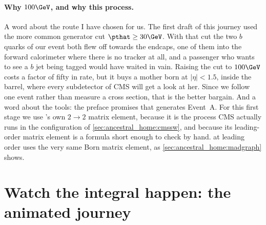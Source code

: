 \paragraph{Why $100\GeV$, and why this process.} A word about the route I
have chosen for us. The first draft of this journey used the more common
generator cut $\pthat\ge30\GeV$. With that cut the two $b$ quarks of our
event both flew off towards the endcaps, one of them into the forward
calorimeter where there is no tracker at all, and a passenger who wants to see
a $b$ jet being tagged would have waited in vain. Raising the cut to
$100\GeV$ costs a factor of fifty in rate, but it buys a mother born at
$|\eta|<1.5$, inside the barrel, where every subdetector of CMS will get a
look at her. Since we follow one event rather than measure a cross section,
that is the better bargain. And a word about the tools: the preface promises
that \MG generates Event~A. For this first stage we use \PYTHIA's own
$2\to2$ matrix element, because it is the process CMS actually runs in the
configuration of \cref{sec:ancestral_home:cmssw}, and because its
leading-order matrix element is a formula short enough to check by hand. \MG
at leading order uses the very same Born matrix element, as
\cref{sec:ancestral_home:madgraph} shows.

\section{Watch the integral happen: the animated journey}
\label{sec:ancestral_home:animation}


